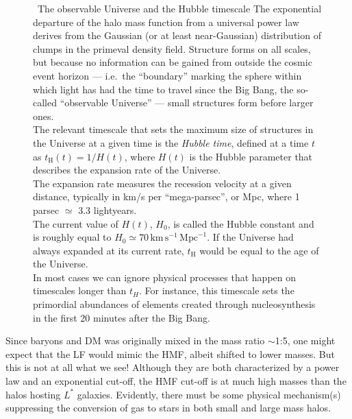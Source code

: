 \documentclass[useAMS]{aa}
\begin{document}
\begin{figure}[!t]
\begin{bclogo}[
    couleur=gray!20,
    epBord=1,
    arrondi=0.1,
    logo=\bcinfo,
    marge=8,
    ombre=false, %
    couleurBord=gray!60,
    barre=line]
    { \ \textsf{The observable Universe and the Hubble timescale}}
    \small{\textsf{
The exponential departure of the halo mass function from a universal power law derives from the Gaussian (or at least near-Gaussian) distribution of clumps in the primeval density field.
Structure forms on all scales, but because no information can be gained from outside the cosmic event horizon --- i.e.~the ``boundary'' marking the sphere within which light has had the time to travel since the Big Bang, the so-called ``observable Universe'' --- small structures form before larger ones.\vspace{1mm}\\
The relevant timescale that sets the maximum size of structures in the Universe at a given time is the \emph{Hubble time}, defined at a time $t$ as $t_\mathrm{H}(t) = 1/H(t)$, where $H(t)$ is the Hubble parameter that describes the expansion rate of the Universe.\vspace{1mm}\\
The expansion rate measures the recession velocity at a given distance, typically in km/s per ``mega-parsec'', or Mpc, where 1 parsec $\simeq$ 3.3 lightyears.\vspace{1mm}\\
The current value of $H(t)$, $H_0$, is called the Hubble constant and is roughly equal to $H_0\simeq70\,\mathrm{km}\,\mathrm{s}^{-1}\,\mathrm{Mpc}^{-1}$.
If the Universe had always expanded at its current rate, $t_\mathrm{H}$ would be equal to the age of the Universe.\vspace{1mm}\\
In most cases we can ignore physical processes that happen on timescales longer than $t_{H}$.
For instance, this timescale sets the primordial abundances of elements created through nucleosynthesis in the first 20 minutes after the Big Bang.
    }}
\label{info:obsuni}
\end{bclogo}
     \endminipage
\end{figure}

Since baryons and DM was originally mixed in the mass ratio $\sim$1:5, one might expect that the LF would mimic the HMF, albeit shifted to lower masses.
But this is not at all what we see! Although they are both characterized by a power law and an exponential cut-off, the HMF cut-off is at much high masses than the halos hosting $L^*$ galaxies.
Evidently, there must be some physical mechanism(s) suppressing the conversion of gas to stars in both small and large mass halos.
\end{document}
